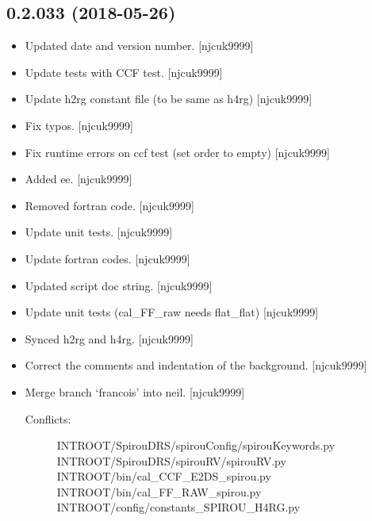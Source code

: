 \documentclass[a4paper,10pt,english]{report}
\begin{document}
\subsection{0.2.033 (2018-05-26)}
\label{\detokenize{misc/changelog:id428}}\begin{itemize}
\item {} 
Updated date and version number. {[}njcuk9999{]}

\item {} 
Update tests with CCF test. {[}njcuk9999{]}

\item {} 
Update h2rg constant file (to be same as h4rg) {[}njcuk9999{]}

\item {} 
Fix typos. {[}njcuk9999{]}

\item {} 
Fix runtime errors on ccf test (set order to empty) {[}njcuk9999{]}

\item {} 
Added ee. {[}njcuk9999{]}

\item {} 
Removed fortran code. {[}njcuk9999{]}

\item {} 
Update unit tests. {[}njcuk9999{]}

\item {} 
Update fortran codes. {[}njcuk9999{]}

\item {} 
Updated script doc string. {[}njcuk9999{]}

\item {} 
Update unit tests (cal\_FF\_raw needs flat\_flat) {[}njcuk9999{]}

\item {} 
Synced h2rg and h4rg. {[}njcuk9999{]}

\item {} 
Correct the comments and indentation of the background. {[}njcuk9999{]}

\item {} 
Merge branch ‘francois’ into neil. {[}njcuk9999{]}
\begin{description}
\item[{Conflicts:}] \leavevmode
INTROOT/SpirouDRS/spirouConfig/spirouKeywords.py
INTROOT/SpirouDRS/spirouRV/spirouRV.py
INTROOT/bin/cal\_CCF\_E2DS\_spirou.py
INTROOT/bin/cal\_FF\_RAW\_spirou.py
INTROOT/config/constants\_SPIROU\_H4RG.py

\end{description}


\end{itemize}
\end{document}
